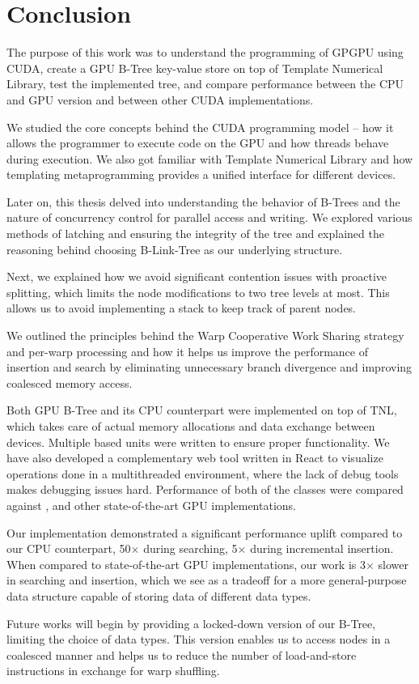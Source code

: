 \section{Conclusion}

The purpose of this work was to understand the programming of GPGPU using CUDA, create a GPU B-Tree key-value store on top of Template Numerical Library, test the implemented tree, and compare performance between the CPU and GPU version and between other CUDA implementations.

We studied the core concepts behind the CUDA programming model -- how it allows the programmer to execute code on the GPU and how threads behave during execution. We also got familiar with Template Numerical Library and how templating metaprogramming provides a unified interface for different devices.

Later on, this thesis delved into understanding the behavior of B-Trees and the nature of concurrency control for parallel access and writing. We explored various methods of latching and ensuring the integrity of the tree and explained the reasoning behind choosing B-Link-Tree as our underlying structure.

Next, we explained how we avoid significant contention issues with proactive splitting, which limits the node modifications to two tree levels at most. This allows us to avoid implementing a stack to keep track of parent nodes.

We outlined the principles behind the Warp Cooperative Work Sharing strategy and per-warp processing and how it helps us improve the performance of insertion and search by eliminating unnecessary branch divergence and improving coalesced memory access.

Both GPU B-Tree and its CPU counterpart were implemented on top of TNL, which takes care of actual memory allocations and data exchange between devices. Multiple  based units were written to ensure proper functionality. We have also developed a complementary web tool written in React to visualize operations done in a multithreaded environment, where the lack of debug tools makes debugging issues hard. Performance of both of the classes were compared against ,  and other state-of-the-art GPU implementations.

Our implementation demonstrated a significant performance uplift compared to our CPU counterpart, 50$\times$ during searching, 5$\times$ during incremental insertion. When compared to state-of-the-art GPU implementations, our work is 3$\times$ slower in searching and insertion, which we see as a tradeoff for a more general-purpose data structure capable of storing data of different data types.

Future works will begin by providing a locked-down version of our B-Tree, limiting the choice of data types. This version enables us to access nodes in a coalesced manner and helps us to reduce the number of load-and-store instructions in exchange for warp shuffling.